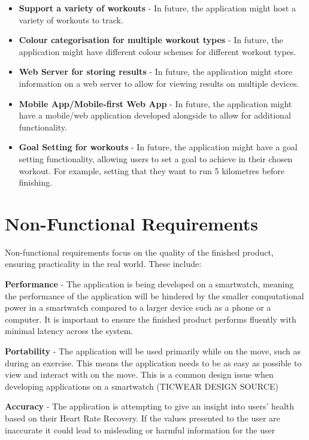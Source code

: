 \documentclass{l4proj}
\begin{document}
\begin{itemize}
    \item \textbf{Support a variety of workouts} - In future, the application might host a variety of workouts to track.
    \item \textbf{Colour categorisation for multiple workout types} - In future, the application might have different colour schemes for different workout types.
    \item \textbf{Web Server for storing results} - In future, the application might store information on a web server to allow for viewing results on multiple devices.
    \item \textbf{Mobile App/Mobile-first Web App} - In future, the application might have a mobile/web application developed alongside to allow for additional functionality.
    \item \textbf{Goal Setting for workouts} - In future, the application might have a goal setting functionality, allowing users to set a goal to achieve in their chosen workout. For example, setting that they want to run 5 kilometres before finishing.
\end{itemize}

\section{Non-Functional Requirements}

Non-functional requirements focus on the quality of the finished product, ensuring practicality in the real world. These include:

\textbf{Performance} - The application is being developed on a smartwatch, meaning the performance of the application will be hindered by the smaller computational power in a smartwatch compared to a larger device such as a phone or a computer. It is important to ensure the finished product performs fluently with minimal latency across the system.

\textbf{Portability} -  The application will be used primarily while on the move, such as during an exercise. This means the application needs to be as easy as possible to view and interact with on the move. This is a common design issue when developing applications on a smartwatch (TICWEAR DESIGN SOURCE)

\textbf{Accuracy} - The application is attempting to give an insight into users' health based on their Heart Rate Recovery. If the values presented to the user are inaccurate it could lead to misleading or harmful information for the user
\end{document}
